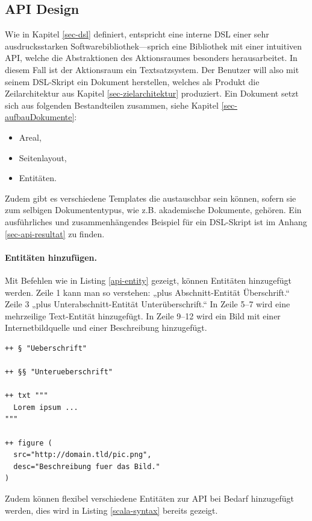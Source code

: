 \subsection{API Design}\label{sec-api-design}

Wie in Kapitel \ref{sec-dsl} definiert, entspricht eine interne DSL einer sehr
ausdrucksstarken Softwarebibliothek---sprich eine Bibliothek
mit einer intuitiven API, welche die Abstraktionen
des Aktionsraumes besonders herausarbeitet.
In diesem Fall ist der Aktionsraum ein Textsatzsystem. Der Benutzer will
also mit seinem DSL-Skript ein Dokument herstellen, welches als Produkt die
Zeilarchitektur aus Kapitel \ref{sec-zielarchitektur} produziert.
Ein Dokument setzt sich aus folgenden Bestandteilen
zusammen, siehe Kapitel \ref{sec-aufbauDokumente}:

\begin{itemize}
  \item Areal,
  \item Seitenlayout,
  \item Entitäten.
\end{itemize}

Zudem gibt es verschiedene Templates die austauschbar sein können, sofern
sie zum selbigen Dokumententypus, wie z.B. akademische Dokumente, gehören.
Ein ausführliches und zusammenhängendes Beispiel für ein DSL-Skript
ist im Anhang \ref{sec-api-resultat} zu finden.

\paragraph{Entitäten hinzufügen.} Mit Befehlen wie in Listing
\ref{api-entity} gezeigt, können Entitäten hinzugefügt werden.
Zeile 1 kann man so verstehen: „plus Abschnitt-Entität Überschrift.“
Zeile 3 „plus Unterabschnitt-Entität Unterüberschrift.“
In Zeile 5--7 wird eine mehrzeilige Text-Entität hinzugefügt.
In Zeile 9--12 wird ein Bild mit einer Internetbildquelle und einer
Beschreibung hinzugefügt.

\begin{lstlisting}[label=api-entity,caption=Entitäten hinzufügen.]
++ § "Ueberschrift"

++ §§ "Unterueberschrift"

++ txt """
  Lorem ipsum ...
"""

++ figure (
  src="http://domain.tld/pic.png",
  desc="Beschreibung fuer das Bild."
)
\end{lstlisting}

Zudem können flexibel verschiedene Entitäten zur API bei Bedarf
hinzugefügt werden, dies wird in Listing \ref{scala-syntax} bereits gezeigt.

